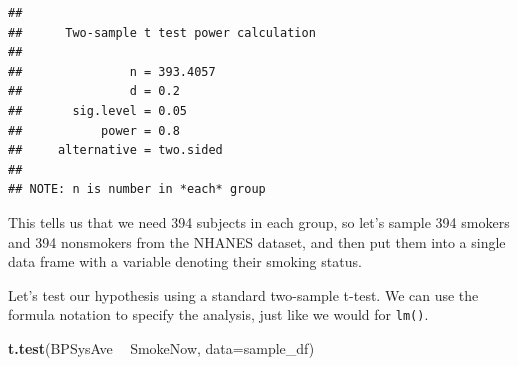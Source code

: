 \documentclass[12pt,]{book}
\newenvironment{Shaded}{\begin{snugshade}}{\end{snugshade}}
\newcommand{\DataTypeTok}[1]{\textcolor[rgb]{0.13,0.29,0.53}{#1}}
\newcommand{\KeywordTok}[1]{\textcolor[rgb]{0.13,0.29,0.53}{\textbf{#1}}}
\newcommand{\NormalTok}[1]{#1}
\newcommand{\OperatorTok}[1]{\textcolor[rgb]{0.81,0.36,0.00}{\textbf{#1}}}
\newcommand{\StringTok}[1]{\textcolor[rgb]{0.31,0.60,0.02}{#1}}
\begin{document}
\begin{verbatim}
## 
##      Two-sample t test power calculation 
## 
##               n = 393.4057
##               d = 0.2
##       sig.level = 0.05
##           power = 0.8
##     alternative = two.sided
## 
## NOTE: n is number in *each* group
\end{verbatim}

This tells us that we need 394 subjects in each group, so let's sample 394 smokers and 394 nonsmokers from the NHANES dataset, and then put them into a single data frame with a variable denoting their smoking status.

\begin{Shaded}
\end{Shaded}

Let's test our hypothesis using a standard two-sample t-test. We can use the formula notation to specify the analysis, just like we would for \texttt{lm()}.

\begin{Shaded}
\begin{Highlighting}[]
\KeywordTok{t.test}\NormalTok{(BPSysAve }\OperatorTok{~}\StringTok{ }\NormalTok{SmokeNow, }\DataTypeTok{data=}\NormalTok{sample_df)}
\end{Highlighting}
\end{Shaded}
\end{document}
